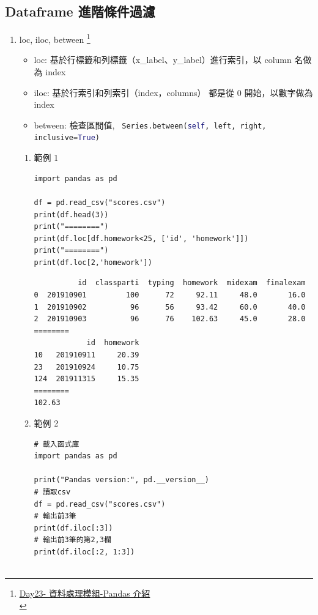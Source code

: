 \documentclass[a4paper,12pt]{article}
\begin{document}
\subsection{Dataframe 進階條件過濾}
\label{sec:org1c7355e}
\begin{enumerate}
\item loc, iloc, between \footnote{\href{https://ithelp.ithome.com.tw/articles/10208412}{Day23- 資料處理模組-Pandas 介紹}\\}
\label{sec:org90181cf}
\begin{itemize}
\item loc: 基於行標籤和列標籤（x\_label、y\_label）進行索引，以 column 名做為 index\\
\item iloc: 基於行索引和列索引（index，columns） 都是從 0 開始，以數字做為 index\\
\item between: 檢查區間值, \lstinline[breaklines=true,language=Python]~ Series.between(self, left, right, inclusive=True) ~\\
\end{itemize}
\begin{enumerate}
\item 範例 1
\label{sec:orgffc23fc}
\lstset{breaklines=true,language=Python,label= ,caption= ,captionpos=b,firstnumber=1,numbers=left}
\begin{lstlisting}
import pandas as pd

df = pd.read_csv("scores.csv")
print(df.head(3))
print("========")
print(df.loc[df.homework<25, ['id', 'homework']])
print("========")
print(df.loc[2,'homework'])
\end{lstlisting}

\begin{verbatim}
          id  classparti  typing  homework  midexam  finalexam
0  201910901         100      72     92.11     48.0       16.0
1  201910902          96      56     93.42     60.0       40.0
2  201910903          96      76    102.63     45.0       28.0
========
            id  homework
10   201910911     20.39
23   201910924     10.75
124  201911315     15.35
========
102.63
\end{verbatim}
\item 範例 2
\label{sec:org587a567}
\lstset{breaklines=true,language=Python,label= ,caption= ,captionpos=b,firstnumber=1,numbers=left}
\begin{lstlisting}
# 載入函式庫
import pandas as pd

print("Pandas version:", pd.__version__)
# 讀取csv
df = pd.read_csv("scores.csv")
# 輸出前3筆
print(df.iloc[:3])
# 輸出前3筆的第2,3欄
print(df.iloc[:2, 1:3])


\end{lstlisting}
\end{enumerate}
\end{enumerate}
\end{document}
